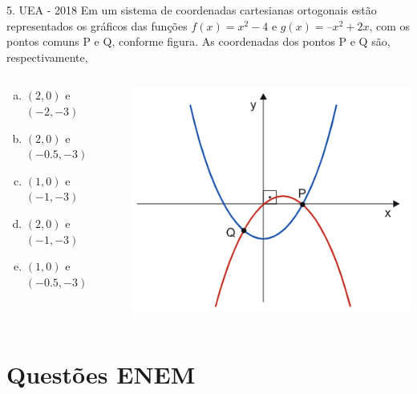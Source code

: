 \documentclass[11pt]{beamer}
\begin{document}
\begin{frame}{5. UEA - 2018}
    Em um sistema de coordenadas cartesianas ortogonais estão representados os gráficos das funções $f(x) = x^{2}-4$ e $g(x) = –x^{2}+2x$, com os pontos comuns P e Q, conforme figura. As coordenadas dos pontos P e Q são, respectivamente,

    \begin{columns}
        \begin{column}{0.4\textwidth}
            \begin{enumerate}[a)]
                \item $(2,0)$ e $(-2,-3)$  
                \item $(2,0)$ e $(-0.5,-3)$
                \item $(1,0)$ e $(-1,-3)$ 
                \item $(2,0)$ e $(-1,-3)$ %
                \item $(1,0)$ e $(-0.5,-3)$
            \end{enumerate}
        \end{column}

        \begin{column}{0.5\textwidth}
            \centering
            \includegraphics[width=0.8\linewidth]{imagens/uea-macro-2018.png}
        \end{column}
    \end{columns}
    
\end{frame}

\section{Questões ENEM}
\end{document}
